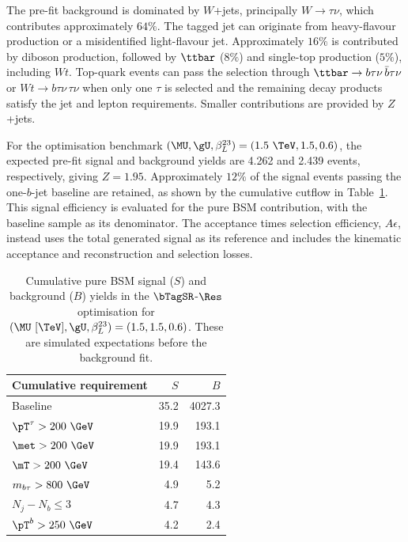 The pre-fit background is dominated by $W$+jets, principally $W\to\tau\nu$, which contributes approximately $64\%$.
The tagged jet can originate from heavy-flavour production or a misidentified light-flavour jet.
Approximately $16\%$ is contributed by diboson production, followed by $\ttbar$ ($8\%$) and single-top production ($5\%$), including $Wt$.
Top-quark events can pass the selection through $\ttbar\to b\tau\nu\,\bar b\tau\nu$ or $Wt\to b\tau\nu\,\tau\nu$ when only one $\tau$ is selected and the remaining decay products satisfy the jet and lepton requirements.
Smaller contributions are provided by $Z$+jets.

For the optimisation benchmark $(\MU,\gU,\beta_L^{23})=(1.5~\TeV,1.5,0.6)$, the expected pre-fit signal and background yields are 4.262 and 2.439 events, respectively, giving $Z=1.95$.
Approximately $12\%$ of the signal events passing the one-$b$-jet baseline are retained, as shown by the cumulative cutflow in Table~\ref{tab:ch7_cutflow_res}.
This signal efficiency is evaluated for the pure BSM contribution, with the baseline sample as its denominator.
The acceptance times selection efficiency, $A\epsilon$, instead uses the total generated signal as its reference and includes the kinematic acceptance and reconstruction and selection losses.

\begin{table}[htbp]
    \centering
    \small
    \caption{Cumulative pure BSM signal ($S$) and background ($B$) yields in the $\bTagSR$-$\Res$ optimisation for $(\MU~[\TeV],\gU,\beta_L^{23})=(1.5,1.5,0.6)$. These are simulated expectations before the background fit.}
    \label{tab:ch7_cutflow_res}
    \begin{tabular}{lrr}
        \toprule
        Cumulative requirement & $S$ & $B$ \\
        \midrule
        Baseline & 35.2 & 4027.3 \\
        $\pT^\tau>200~\GeV$ & 19.9 & 193.1 \\
        $\met>200~\GeV$ & 19.9 & 193.1 \\
        $\mT>200~\GeV$ & 19.4 & 143.6 \\
        $m_{b\tau}>800~\GeV$ & 4.9 & 5.2 \\
        $N_j-N_b\leq3$ & 4.7 & 4.3 \\
        $\pT^b>250~\GeV$ & 4.2 & 2.4 \\
        \bottomrule
    \end{tabular}
\end{table}

